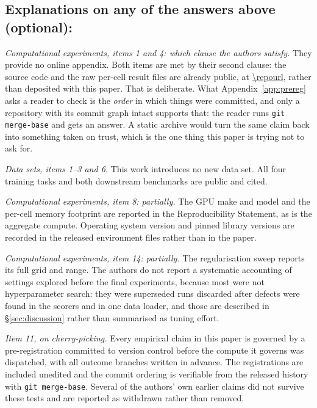 \subsection*{Explanations on any of the answers above (optional):}

\emph{Computational experiments, items 1 and 4: which clause the authors satisfy.} They
provide no online appendix. Both items are met by their second clause: the
source code and the raw per-cell result files are already public, at
\url{\repourl}, rather than deposited with this paper. That is deliberate.
What Appendix~\ref{app:prereg} asks a reader to check is the \emph{order} in
which things were committed, and only a repository with its commit graph
intact supports that: the reader runs \texttt{git merge-base} and gets an
answer. A static archive would turn the same claim back into something taken
on trust, which is the one thing this paper is trying not to ask for.

\emph{Data sets, items 1--3 and 6.} This work introduces no new data set. All
four training tasks and both downstream benchmarks are public and cited.

\emph{Computational experiments, item 8: partially.} The GPU make and model
and the per-cell memory footprint are reported in the Reproducibility
Statement, as is the aggregate compute. Operating system
version and pinned library versions are recorded in the released environment
files rather than in the paper.

\emph{Computational experiments, item 14: partially.} The regularisation sweep
reports its full grid and range. The authors do not report a systematic accounting of
settings explored before the final experiments, because most were not
hyperparameter search: they were superseded runs discarded after defects were
found in the scorers and in one data loader, and those are described in
\S\ref{sec:discussion} rather than summarised as tuning effort.

\emph{Item 11, on cherry-picking.} Every empirical claim in this paper is
governed by a pre-registration committed to version control before the compute
it governs was dispatched, with all outcome branches written in advance. The
registrations are included unedited and the commit ordering is verifiable from
the released history with \texttt{git merge-base}. Several of the authors' own earlier
claims did not survive these tests and are reported as withdrawn rather than
removed.
